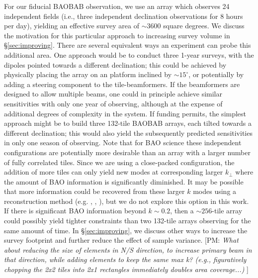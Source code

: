 \documentclass[10pt,iop]{emulateapj}
\def\pvm#1{[PM: {\it #1}] }
\begin{document}
For our fiducial BAOBAB observation, we use an array which observes 24 independent fields
(i.e., three independent declination observations for 8 hours per day), yielding an
effective survey area of $\sim 3600$ square degrees.  
We discuss the motivation for this particular approach to increasing survey volume in
\S\ref{sec:improving}.
There are several equivalent ways an 
experiment can probe this additional area.  One approach would be to conduct three 1-year surveys,
with the dipoles pointed towards a different declination; this could be achieved by physically
placing the array on an platform inclined by $\sim 15^{\circ}$, or potentially by adding a steering
component to the tile-beamformers.  If the beamformers are designed to allow multiple beams, one
could in principle achieve similar sensitivities with only one year of observing, although
at the expense of additional degrees of complexity in the system.  If funding permits, the 
simplest approach might be to build three 132-tile BAOBAB arrays, each tilted towards a different
declination; this would also yield the subsequently predicted sensitivities in only one season of
observing.  Note that for BAO science these independent configurations are
potentially more desirable than
an array with a larger number of fully correlated tiles.  Since we are using a close-packed
configuration, the addition of more tiles can only yield new modes at corresponding larger $k_{\perp}$ 
where the amount of BAO information is significantly diminished.  It may be possible
that more information could be recovered from these larger $k$ modes using a reconstruction
method (e.g. \citealt{eisenstein_et_al_2007}, \citealt{padmanabhan_et_al_2009},
\citealt{noh_et_al_2009}), but we do not explore this option in this work.  
If there is significant BAO information beyond $k \sim 0.2$, then a $\sim 256$-tile array could
possibly yield tighter constraints than two 132-tile arrays observing for the same
amount of time.
In \S\ref{sec:improving},
we discuss other ways to increase the survey footprint and further reduce the effect of sample
variance.
\pvm{What about reducing the size of elements in N/S direction, to increase 
primary beam in that direction, while adding elements to keep the same max k?
(e.g., figuratively chopping the 2x2 tiles into 2x1 rectangles immediately 
doubles area coverage...) }
\end{document}
